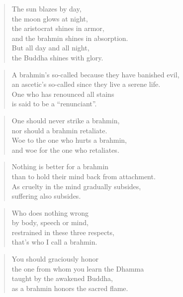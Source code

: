 \documentclass[12pt,openany]{book}%
\begin{document}
\begin{verse}%
The sun blazes by day, \\
the moon glows at night, \\
the aristocrat shines in armor, \\
and the brahmin shines in absorption. \\
But all day and all night, \\
the Buddha shines with glory. 

%
\end{verse}

\begin{verse}%
A brahmin’s so-called because they have banished evil, \\
an ascetic’s so-called since they live a serene life. \\
One who has renounced all stains \\
is said to be a “renunciant”. 

%
\end{verse}

\begin{verse}%
One should never strike a brahmin, \\
nor should a brahmin retaliate. \\
Woe to the one who hurts a brahmin, \\
and woe for the one who retaliates. 

%
\end{verse}

\begin{verse}%
Nothing is better for a brahmin \\
than to hold their mind back from attachment. \\
As cruelty in the mind gradually subsides, \\
suffering also subsides. 

%
\end{verse}

\begin{verse}%
Who does nothing wrong \\
by body, speech or mind, \\
restrained in these three respects, \\
that’s who I call a brahmin. 

%
\end{verse}

\begin{verse}%
You should graciously honor \\
the one from whom you learn the Dhamma \\
taught by the awakened Buddha, \\
as a brahmin honors the sacred flame. 

%
\end{verse}
\end{document}
